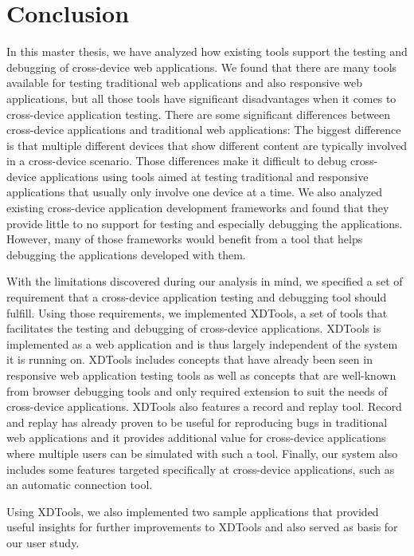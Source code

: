 \chapter{Conclusion}

In this master thesis, we have analyzed how existing tools support the testing and debugging of cross-device web applications. We found that there are many tools available for testing traditional web applications and also responsive web applications, but all those tools have significant disadvantages when it comes to cross-device application testing. There are some significant differences between cross-device applications and traditional web applications: The biggest difference is that multiple different devices that show different content are typically involved in a cross-device scenario. Those differences make it difficult to debug cross-device applications using tools aimed at testing traditional and responsive applications that usually only involve one device at a time. We also analyzed existing cross-device application development frameworks and found that they provide little to no support for testing and especially debugging the applications. However, many of those frameworks would benefit from a tool that helps debugging the applications developed with them.

With the limitations discovered during our analysis in mind, we specified a set of requirement that a cross-device application testing and debugging tool should fulfill. Using those requirements, we implemented XDTools, a set of tools that facilitates the testing and debugging of cross-device applications. XDTools is implemented as a web application and is thus largely independent of the system it is running on. XDTools includes concepts that have already been seen in responsive web application testing tools as well as concepts that are well-known from browser debugging tools and only required extension to suit the needs of cross-device applications. XDTools also features a record and replay tool. Record and replay has already proven to be useful for reproducing bugs in traditional web applications and it provides additional value for cross-device applications where multiple users can be simulated with such a tool. Finally, our system also includes some features targeted specifically at cross-device applications, such as an automatic connection tool. 

Using XDTools, we also implemented two sample applications that provided useful insights for further improvements to XDTools and also served as basis for our user study. 

